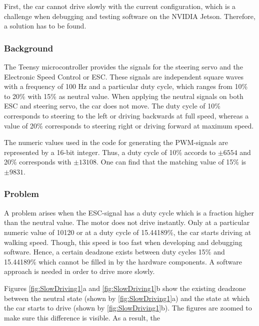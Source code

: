 \documentclass[conference,a4paper]{IEEEtran}
\begin{document}

First, the car cannot drive slowly with the current configuration, which is a challenge when debugging and testing software on the NVIDIA Jetson. Therefore, a solution has to be found. 

\subsubsection{Background}The Teensy microcontroller provides the signals for the steering servo and the Electronic Speed Control or ESC. These signals are independent square waves with a frequency of 100 Hz and a particular duty cycle, which ranges from 10\% to 20\% with 15\% as neutral value. When applying the neutral signals on both ESC and steering servo, the car does not move. The duty cycle of 10\% corresponds to steering to the left or driving backwards at full speed, whereas a value of 20\% corresponds to steering right or driving forward at maximum speed.

The numeric values used in the code for generating the PWM-signals are represented by a 16-bit integer. Thus, a duty cycle of 10\% accords to $\pm 6554$ and 20\% corresponds with $\pm 13108$. One can find that the matching value of 15\% is $\pm 9831$.

\subsubsection{Problem}A problem arises when the ESC-signal has a duty cycle which is a fraction higher than the neutral value. The motor does not drive instantly. Only at a particular numeric value of 10120 or at a duty cycle of 15.44189\%, the car starts driving at walking speed. Though, this speed is too fast when developing and debugging software. Hence, a certain deadzone exists between duty cycles 15\% and 15.44189\% which cannot be filled in by the hardware components. A software approach is needed in order to drive more slowly.

Figures \ref{fig:SlowDriving1}a and \ref{fig:SlowDriving1}b show the existing deadzone between the neutral state (shown by \ref{fig:SlowDriving1}a) and the state at which the car starts to drive (shown by \ref{fig:SlowDriving1}b). The figures are zoomed to make sure this difference is visible. As a result, the 
\end{document}
